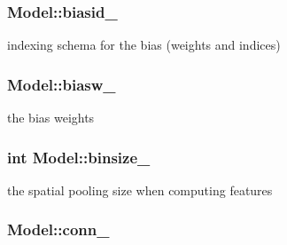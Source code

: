 \hypertarget{classModel_a7c3905dd5e45a2e60da02c783a49db9c}{
\subsubsection[{biasid\-\_\-}]{ {\bf \-Model\-::biasid\-\_\-}}}\label{classModel_a7c3905dd5e45a2e60da02c783a49db9c}


indexing schema for the bias (weights and indices) 

\hypertarget{classModel_ab870c45d7637a43ba73c81cc4080a497}{
\subsubsection[{biasw\-\_\-}]{ {\bf \-Model\-::biasw\-\_\-}}}\label{classModel_ab870c45d7637a43ba73c81cc4080a497}


the bias weights 

\hypertarget{classModel_af34c4284d739cac02812d76eaa231679}{
\subsubsection[{binsize\-\_\-}]{\setlength{\rightskip}{0pt plus 5cm}int {\bf \-Model\-::binsize\-\_\-}}}\label{classModel_af34c4284d739cac02812d76eaa231679}


the spatial pooling size when computing features 

\hypertarget{classModel_a976b10b7048b41203eae19c141654abf}{
\subsubsection[{conn\-\_\-}]{ {\bf \-Model\-::conn\-\_\-}}}\label{classModel_a976b10b7048b41203eae19c141654abf}


